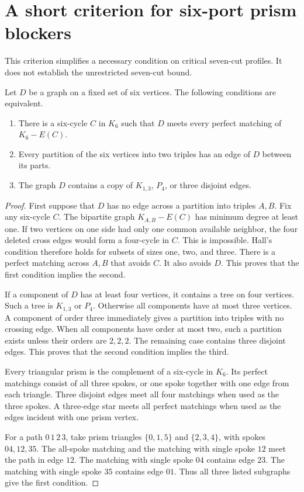 \section{A short criterion for six-port prism blockers}
\label{sec:random-seven-prism-blockers}

This criterion simplifies a necessary condition on critical seven-cut profiles.
It does not establish the unrestricted seven-cut bound.

\begin{lemma}
\label{lem:random-seven-prism-blocker}
Let $D$ be a graph on a fixed set of six vertices.
The following conditions are equivalent.
\begin{enumerate}
\item There is a six-cycle $C$ in $K_6$ such that $D$ meets every perfect matching of $K_6-E(C)$.
\item Every partition of the six vertices into two triples has an edge of $D$ between its parts.
\item The graph $D$ contains a copy of $K_{1,3}$, $P_4$, or three disjoint edges.
\end{enumerate}
\end{lemma}

\begin{proof}
First suppose that $D$ has no edge across a partition into triples $A,B$.
Fix any six-cycle $C$.
The bipartite graph $K_{A,B}-E(C)$ has minimum degree at least one.
If two vertices on one side had only one common available neighbor, the four deleted cross edges would form a four-cycle in $C$.
This is impossible.
Hall's condition therefore holds for subsets of sizes one, two, and three.
There is a perfect matching across $A,B$ that avoids $C$.
It also avoids $D$.
This proves that the first condition implies the second.

If a component of $D$ has at least four vertices, it contains a tree on four vertices.
Such a tree is $K_{1,3}$ or $P_4$.
Otherwise all components have at most three vertices.
A component of order three immediately gives a partition into triples with no crossing edge.
When all components have order at most two, such a partition exists unless their orders are $2,2,2$.
The remaining case contains three disjoint edges.
This proves that the second condition implies the third.

Every triangular prism is the complement of a six-cycle in $K_6$.
Its perfect matchings consist of all three spokes, or one spoke together with one edge from each triangle.
Three disjoint edges meet all four matchings when used as the three spokes.
A three-edge star meets all perfect matchings when used as the edges incident with one prism vertex.

For a path $0\,1\,2\,3$, take prism triangles $\{0,1,5\}$ and $\{2,3,4\}$, with spokes $04,12,35$.
The all-spoke matching and the matching with single spoke $12$ meet the path in edge $12$.
The matching with single spoke $04$ contains edge $23$.
The matching with single spoke $35$ contains edge $01$.
Thus all three listed subgraphs give the first condition.
\end{proof}

